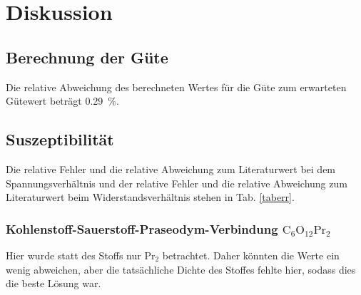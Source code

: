 \section{Diskussion}
\label{sec:Diskussion}

\subsection{Berechnung der Güte}
Die relative Abweichung des berechneten Wertes für die Güte zum erwarteten Gütewert beträgt \SI{0.29}{\percent}. 

\subsection{Suszeptibilität}

Die relative Fehler und die relative Abweichung zum Literaturwert bei dem Spannungsverhältnis und der relative Fehler und die relative Abweichung zum Literaturwert beim Widerstandsverhältnis stehen in Tab. \ref{taberr}. 

\subsubsection{Kohlenstoff-Sauerstoff-Praseodym-Verbindung $\text{C}_6 \text{O}_{12} \text{Pr}_2$}
Hier wurde statt des Stoffs nur $\text{Pr}_2$ betrachtet. Daher könnten die Werte ein wenig abweichen, aber die tatsächliche Dichte des Stoffes fehlte hier, sodass dies die beste Lösung war.



